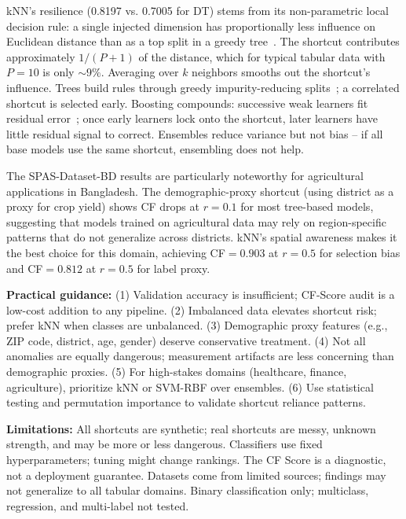 \documentclass[conference]{IEEEtran}
\begin{document}
kNN's resilience (0.8197 vs. 0.7005 for DT) stems from its non-parametric local decision rule: a single injected dimension has proportionally less influence on Euclidean distance than as a top split in a greedy tree~\cite{cover1967knn}. The shortcut contributes approximately $1/(P+1)$ of the distance, which for typical tabular data with $P=10$ is only $\sim9\%$. Averaging over $k$ neighbors smooths out the shortcut's influence. Trees build rules through greedy impurity-reducing splits~\cite{breiman2001rf}; a correlated shortcut is selected early. Boosting compounds: successive weak learners fit residual error~\cite{freund1997adaboost}; once early learners lock onto the shortcut, later learners have little residual signal to correct. Ensembles reduce variance but not bias -- if all base models use the same shortcut, ensembling does not help.

The SPAS-Dataset-BD results are particularly noteworthy for agricultural applications in Bangladesh. The demographic-proxy shortcut (using district as a proxy for crop yield) shows CF drops at $r=0.1$ for most tree-based models, suggesting that models trained on agricultural data may rely on region-specific patterns that do not generalize across districts. kNN's spatial awareness makes it the best choice for this domain, achieving CF$=0.903$ at $r=0.5$ for selection bias and CF$=0.812$ at $r=0.5$ for label proxy.

\textbf{Practical guidance:} (1) Validation accuracy is insufficient; CF-Score audit is a low-cost addition to any pipeline. (2) Imbalanced data elevates shortcut risk; prefer kNN when classes are unbalanced. (3) Demographic proxy features (e.g., ZIP code, district, age, gender) deserve conservative treatment. (4) Not all anomalies are equally dangerous; measurement artifacts are less concerning than demographic proxies. (5) For high-stakes domains (healthcare, finance, agriculture), prioritize kNN or SVM-RBF over ensembles. (6) Use statistical testing and permutation importance to validate shortcut reliance patterns.

\textbf{Limitations:} All shortcuts are synthetic; real shortcuts are messy, unknown strength, and may be more or less dangerous. Classifiers use fixed hyperparameters; tuning might change rankings. The CF Score is a diagnostic, not a deployment guarantee. Datasets come from limited sources; findings may not generalize to all tabular domains. Binary classification only; multiclass, regression, and multi-label not tested.

\end{document}
